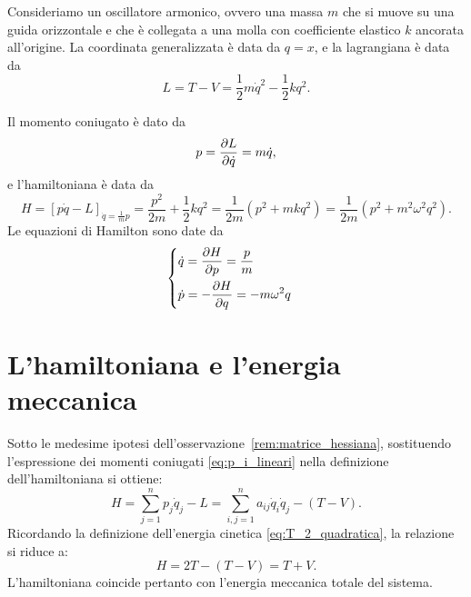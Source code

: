 \begin{example}[Oscillatore armonico]
    Consideriamo un oscillatore armonico, ovvero una massa $m$ che si muove su una guida orizzontale e che è collegata a una molla con coefficiente elastico $k$ ancorata all'origine. La coordinata generalizzata è data da $q = x$, e la lagrangiana è data da
    \begin{equation*}
        L = T - V = \frac{1}{2} m \dot{q}^2 - \frac{1}{2} k q^2.
    \end{equation*}

    Il momento coniugato è dato da
    \begin{equation*}
        p = \pdv{L}{\dot{q}} = m \dot{q},
    \end{equation*}
    e l'hamiltoniana è data da
    \begin{equation*}
        H = \left[p \dot{q} - L\right]_{\dot{q} = \frac{1}{m} p} = \frac{p^2}{2m} + \frac{1}{2} k q^2 = \frac{1}{2m}\left(p^2 + mk q^2\right) = \frac{1}{2m}\left(p^2 + m^2\omega^2 q^2\right).
    \end{equation*}
    Le equazioni di Hamilton sono date da
    \begin{equation*}
        \begin{cases}
            \displaystyle \dot{q} = \pdv{H}{p} = \frac{p}{m} \\[0.3cm]
            \displaystyle \dot{p} = -\pdv{H}{q} = -m\omega^2 q
        \end{cases}
    \end{equation*}
\end{example}

\section{L'hamiltoniana e l'energia meccanica}
Sotto le medesime ipotesi dell'osservazione~\ref{rem:matrice_hessiana}, sostituendo l'espressione dei momenti coniugati \eqref{eq:p_i_lineari} nella definizione dell'hamiltoniana si ottiene:
\begin{equation*}
    H = \sum_{j=1}^n p_j \dot{q}_j - L = \sum_{i,j=1}^n a_{ij} \dot{q}_i \dot{q}_j - (T - V).
\end{equation*}
Ricordando la definizione dell'energia cinetica \eqref{eq:T_2_quadratica}, la relazione si riduce a:
\begin{equation*}
    H = 2T - (T - V) = T + V.
\end{equation*}
L'hamiltoniana coincide pertanto con l'energia meccanica totale del sistema.


